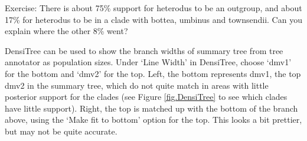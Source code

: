 \documentclass{article}
\begin{document}
Exercise: There is about 75\% support for heterodus to be an outgroup, and about 17\% for heterodus to be in a clade with bottea, umbinus and townsendii. Can you explain where the other 8\% went?


DensiTree can be used to show the branch widths of summary 
tree from tree annotator as population sizes. 
Under `Line Width' in DensiTree, choose `dmv1' for the bottom and `dmv2' for the top.
Left, the bottom represents dmv1, the top dmv2 in the summary tree, which do not quite match 
in areas with little posterior support for the clades (see Figure \ref{fig.DensiTree} to
see which clades have little support).
Right, the top is matched up with the bottom of the branch above, using the `Make fit to bottom'
option for the top. This looks a bit prettier, but may not be quite accurate.

\end{document}
